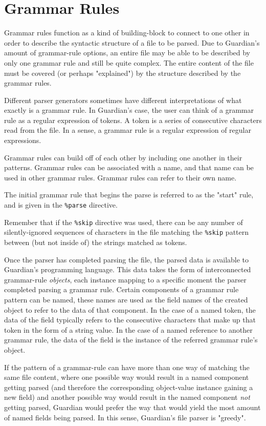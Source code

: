 

\section{Grammar Rules}
{
	Grammar rules function as a kind of building-block to connect to one
	other in order to describe the syntactic structure of a file to be parsed.
	Due to Guardian's amount of grammar-rule options, an entire file
	may be able to be described by only one grammar rule and still be quite
	complex.
	The entire content of the file must be covered (or perhaps "explained") by
	the structure described by the grammar rules.
	
	Different parser generators sometimes have different interpretations of
	what exactly is a grammar rule. In Guardian's case, the user can think
	of a grammar rule as a regular expression of tokens. A token is a series of
	consecutive characters read from the file.
	In a sense, a grammar rule is a regular expression of regular expressions.
	
	Grammar rules can build off of each other by including one another in their
	patterns.
	Grammar rules can be associated with a name, and that name can be used in
	other grammar rules. Grammar rules can refer to their own name.
	
	The initial grammar rule that begins the parse is referred to as the
	"start" rule, and is given in the \texttt{\%parse} directive.
	
	Remember that if the \texttt{\%skip} directive was used, there can be
	any number of silently-ignored sequences of characters in the file matching
	the \texttt{\%skip} pattern between
	(but not inside of) the strings matched as tokens.
	
	Once the parser has completed parsing the file, the parsed data is available
	to Guardian's programming language. This data takes the form of
	interconnected grammar-rule \textit{objects}, each instance mapping to a
	specific moment the parser completed parsing a grammar rule.
	Certain components of a grammar rule pattern can be named, these names
	are used as the field names of the created object to refer to the data of
	that component. In the case of a named token, the data of the field typically
	refers to the consecutive characters that make up that token in the form
	of a string value.
	In the case of a named reference to another grammar rule, the data of the
	field is the instance of the referred grammar rule's object.
	
	If the pattern of a grammar-rule can have more than one way of matching
	the same file content, where one possible way would result in a named
	component getting parsed (and therefore the corresponding object-value
	instance gaining a new field) and another possible way would result in the
	named component \textit{not} getting parsed, Guardian would prefer the
	way that would yield the most amount of named fields being parsed.
	In this sense, Guardian's file parser is "greedy".
	
}
